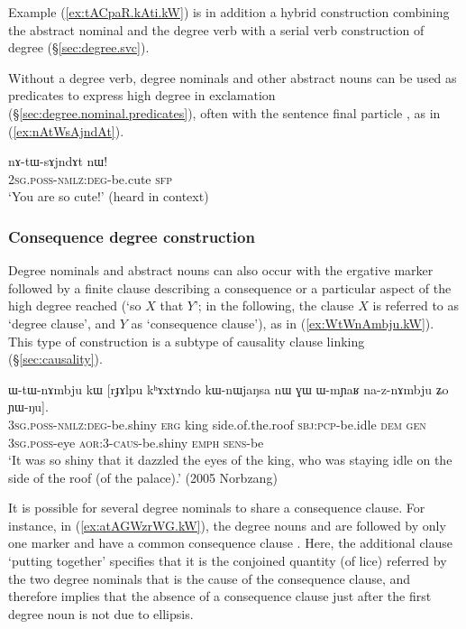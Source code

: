 Example (\ref{ex:tACpaR.kAti.kW}) is in addition a hybrid construction combining the abstract nominal and the degree verb with a serial verb construction of degree (§\ref{sec:degree.svc}).

Without a degree verb, degree nominals and other abstract nouns can be used as predicates to express high degree in exclamation (§\ref{sec:degree.nominal.predicates}), often with the sentence final particle , as in (\ref{ex:nAtWsAjndAt}).

\begin{exe}
\ex \label{ex:nAtWsAjndAt}
\gll nɤ-tɯ-sɤjndɤt nɯ! \\
\textsc{2sg}.\textsc{poss}-\textsc{nmlz}:\textsc{deg}-be.cute \textsc{sfp} \\
\glt `You are so cute!' (heard in context)
\end{exe}



\subsubsection{Consequence degree construction} \label{sec:degree.consequence}
Degree nominals and abstract nouns can also occur with the ergative marker  followed by a finite clause describing a consequence or a particular aspect of the high degree reached (`so $X$ that $Y$'; in the following, the clause $X$ is referred to as `degree clause', and $Y$ as `consequence clause'), as in (\ref{ex:WtWnAmbju.kW}). This type of construction is a subtype of causality clause linking (§\ref{sec:causality}).


\begin{exe}
\ex \label{ex:WtWnAmbju.kW}
\gll ɯ-tɯ-nɤmbju kɯ [rɟɤlpu kʰɤxtɤndo kɯ-nɯjaŋsa nɯ ɣɯ ɯ-mɲaʁ na-z-nɤmbju ʑo ɲɯ-ŋu]. \\
\textsc{3sg}.\textsc{poss}-\textsc{nmlz}:\textsc{deg}-be.shiny \textsc{erg} king side.of.the.roof \textsc{sbj}:\textsc{pcp}-be.idle \textsc{dem} \textsc{gen} \textsc{3sg}.\textsc{poss}-eye \textsc{aor}:3\flobv{}-\textsc{caus}-be.shiny \textsc{emph} \textsc{sens}-be\\
\glt `It was so shiny that it dazzled the eyes of the king, who was staying idle on the side of the roof (of the palace).' (2005 Norbzang)
\end{exe}

It is possible for several degree nominals to share a consequence clause. For instance, in (\ref{ex:atAGWzrWG.kW}), the degree nouns  and  are followed by only one marker  and have a common consequence clause . Here, the additional clause  `putting together' specifies that it is the conjoined quantity (of lice) referred by the two degree nominals that is the cause of the consequence clause, and therefore implies that the absence of a consequence clause just after the first degree noun  is not due to ellipsis.

